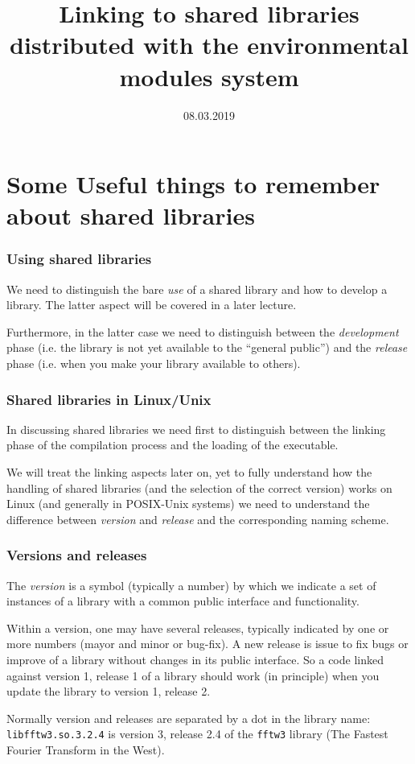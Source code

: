 \documentclass[9pt]{beamer}
\begin{document}
\title{Linking to shared libraries distributed with the environmental modules system}
\date{08.03.2019}

\begin{frame}
\maketitle
\end{frame}

\section{Some Useful things to remember about shared libraries}

\begin{frame}
\frametitle{Using shared libraries}
We need to distinguish the bare \emph{use} of a shared library and how
to develop a library. The latter aspect will be covered in a later lecture.
\medskip

Furthermore, in the latter case we need to distinguish between the
\emph{development} phase (i.e. the library is not yet available to the
``general public'') and the \emph{release} phase (i.e. when you make your
library available to others).
\end{frame}


\begin{frame}
  \frametitle{Shared libraries in Linux/Unix} In
  discussing shared libraries we need first to distinguish between the
  linking phase of the compilation process and the loading of the
  executable. 
\medskip

We will treat the linking aspects later on, yet to fully understand
how the handling of shared libraries (and the selection of the correct
version) works on Linux (and generally in POSIX-Unix systems) we need
to understand the difference between \emph{version} and \emph{release}
and the corresponding naming scheme.
\end{frame}

\begin{frame}
  \frametitle{Versions and releases} 
The \emph{version} is a symbol
  (typically a number) by which we indicate a set of instances of a
  library with \alert{a common public interface and functionality}.
  \smallskip

  Within a version, one may have several releases, typically indicated
  by one or more numbers (mayor and minor or bug-fix). A new release is 
  issue to fix bugs  or improve of a library \alert{without
    changes in its public interface}. So a code linked against version 1,
  release 1 of a library should work (in principle) when you update
  the library to version 1, release 2.
\smallskip

  Normally version and releases are separated by a dot in the library name:
  \texttt{libfftw3.so.3.2.4} is version 3, release 2.4 of the
  \texttt{fftw3} library (The Fastest Fourier Transform in the West).
\end{frame}
\end{document}
